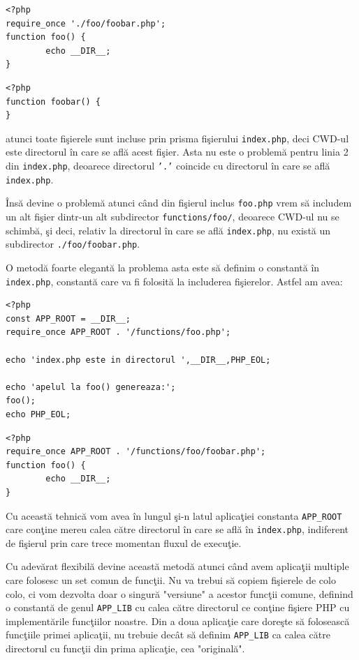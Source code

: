 \begin{lstlisting}[title=functions/foo.php]
<?php
require_once './foo/foobar.php';
function foo() {
        echo __DIR__;
}
\end{lstlisting}

\begin{lstlisting}[title=functions/foo/foobar.php]
<?php
function foobar() {
}
\end{lstlisting}

atunci toate fişierele sunt incluse prin prisma fişierului
\texttt{index.php}, deci CWD-ul este directorul
în care se află acest fişier. Asta nu este
o problemă pentru linia 2 din \texttt{index.php},
deoarece directorul \texttt{'.'} coincide
cu directorul în care se află \texttt{index.php}.

Însă devine o problemă atunci când din fişierul
inclus \texttt{foo.php} vrem să includem
un alt fişier dintr-un alt subdirector
\texttt{functions/foo/}, deoarece CWD-ul nu se
schimbă, şi deci, relativ la directorul
în care se află \texttt{index.php}, nu există
un subdirector \texttt{./foo/foobar.php}.

O metodă foarte elegantă la problema asta este să definim
o constantă în \texttt{index.php}, constantă care
va fi folosită la includerea fişierelor. Astfel am
avea:

\begin{lstlisting}[title=index.php]
<?php
const APP_ROOT = __DIR__;
require_once APP_ROOT . '/functions/foo.php';

echo 'index.php este in directorul ',__DIR__,PHP_EOL;

echo 'apelul la foo() genereaza:';
foo();
echo PHP_EOL;
\end{lstlisting}

\begin{lstlisting}[title=functions/foo.php]
<?php
require_once APP_ROOT . '/functions/foo/foobar.php';
function foo() {
        echo __DIR__;
}
\end{lstlisting}
Cu această tehnică vom avea în lungul şi-n latul
aplicaţiei constanta \texttt{APP\_ROOT} care
conţine mereu calea către directorul în
care se află în \texttt{index.php}, indiferent
de fişierul prin care trece momentan fluxul
de execuţie.

Cu adevărat flexibilă devine această metodă
atunci când avem aplicaţii multiple care
folosesc un set comun de funcţii. Nu va trebui
să copiem fişierele de colo colo, ci vom
dezvolta doar o singură "versiune" a acestor
funcţii comune, definind o constantă 
de genul \texttt{APP\_LIB} cu calea către
directorul ce conţine fişiere PHP
cu implementările funcţiilor noastre. Din a doua aplicaţie
care doreşte să folosească funcţiile primei
aplicaţii, nu trebuie decât să definim
\texttt{APP\_LIB} ca calea către
directorul cu funcţii din prima aplicaţie,
cea "originală".

